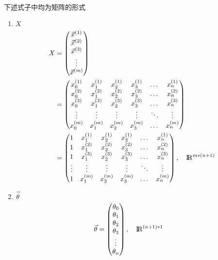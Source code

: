 下述式子中均为矩阵的形式 \\
\begin{enumerate}
\item $X$
\begin{equation} \begin{aligned}
	X & = \left(\begin{matrix}
			\vec{x}^{(1)} \\ \vec{x}^{(2)} \\ \vec{x}^{(3)} \\ \vdots \\ \vec{x}^{(m)}
		\end{matrix}\right) \\
	& = \left( \begin{matrix}
			x_0^{(1)} & x_1^{(1)} & x_2^{(1)} & x_3^{(1)} & \dots & x_n^{(1)} \\
			x_0^{(2)} & x_1^{(2)} & x_2^{(2)} & x_3^{(2)} & \dots & x_n^{(2)} \\
			x_0^{(3)} & x_1^{(3)} & x_2^{(3)} & x_3^{(3)} & \dots & x_n^{(3)} \\
			\vdots    & \vdots    & \vdots    & \vdots    & \ddots & \vdots   \\
			x_0^{(m)} & x_1^{(m)} & x_2^{(m)} & x_3^{(m)} & \dots & x_n^{(m)} \\
			\end{matrix}\right) \\
	& = \left(\begin{matrix}
			1 & x_1^{(1)} & x_2^{(1)} & x_3^{(1)} & \dots & x_n^{(1)} \\
			1 & x_1^{(2)} & x_2^{(2)} & x_3^{(2)} & \dots & x_n^{(2)} \\
			1 & x_1^{(3)} & x_2^{(3)} & x_3^{(3)} & \dots & x_n^{(3)} \\
			\vdots    & \vdots    & \vdots    & \vdots    & \ddots & \vdots   \\
			1 & x_1^{(m)} & x_2^{(m)} & x_3^{(m)} & \dots & x_n^{(m)} \\
		\end{matrix}\right), \quad {\rm I\!R}^{{m*(n+1)}}
\end{aligned} \end{equation}

\item $\vec{\theta}$
\begin{equation} \begin{aligned}
	\vec{\theta} & = \left(\begin{matrix}
			\theta_0 \\ \theta_1 \\ \theta_2 \\ \theta_3 \\ \vdots \\ \theta_n \\
		\end{matrix}\right), \quad {\rm I\!R}^{{(n+1)*1}}
\end{aligned}\end{equation}


\end{enumerate}
